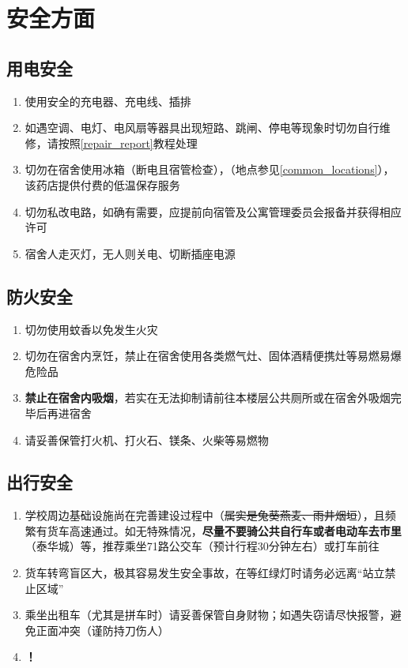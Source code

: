 \chapter[安全方面]{安全方面}
\vspace{-2em}
\section[用电安全]{用电安全}
\begin{enumerate}
    \item 使用安全的充电器、充电线、插排
    \item 如遇空调、电灯、电风扇等器具出现短路、跳闸、停电等现象时切勿自行维修，请按照\uline{\ref{repair_report}}教程处理
    \item 切勿在宿舍使用冰箱（断电且宿管检查），\textbf{}（地点参见\uline{\ref{common_locations}}），该药店提供付费的低温保存服务
    \item 切勿私改电路，如确有需要，应提前向宿管及公寓管理委员会\footnotemark 报备并获得相应许可
    \item 宿舍人走灭灯，无人则关电、切断插座电源
\end{enumerate}

\section[防火安全]{防火安全}
\begin{enumerate}
    \item 切勿使用蚊香以免发生火灾
    \item 切勿在宿舍内烹饪，禁止在宿舍使用各类燃气灶、固体酒精便携灶等易燃易爆危险品
    \item \textbf{禁止在宿舍内吸烟}，若实在无法抑制请前往本楼层公共厕所或在宿舍外吸烟完毕后再进宿舍
    \item 请妥善保管打火机、打火石、镁条、火柴等易燃物
\end{enumerate}

\section[出行安全]{出行安全}
\begin{enumerate}
    \item 学校周边基础设施尚在完善建设过程中（\sout{属实是兔葵燕麦、雨井烟垣}），且频繁有货车高速通过。如无特殊情况，\textbf{尽量不要骑公共自行车或者电动车去市里}（泰华城）等，推荐乘坐71路公交车（预计行程30分钟左右）或打车前往
    \item 货车转弯盲区大，极其容易发生安全事故，在等红绿灯时请务必远离“站立禁止区域”
    \item 乘坐出租车（尤其是拼车时）请妥善保管自身财物；如遇失窃请尽快报警，避免正面冲突（谨防持刀伤人）
    \item \textbf{！}
\end{enumerate}

